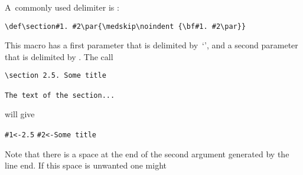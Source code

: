 \documentclass[letterpaper]{book}
\begin{document}
A~commonly used delimiter is :
\begin{verbatim}
\def\section#1. #2\par{\medskip\noindent {\bf#1. #2\par}}
\end{verbatim}
This macro has a first parameter that is delimited by~`',
and a second parameter that is delimited by .
The call
\begin{verbatim}
\section 2.5. Some title

The text of the section...
\end{verbatim}
will give
\begin{disp}\verb>#1<-2.5>\nl
\verb>#2<-Some title>\end{disp}
Note that there is a space at the end of the second argument
generated by the line end. If this space is unwanted one might
\end{document}
